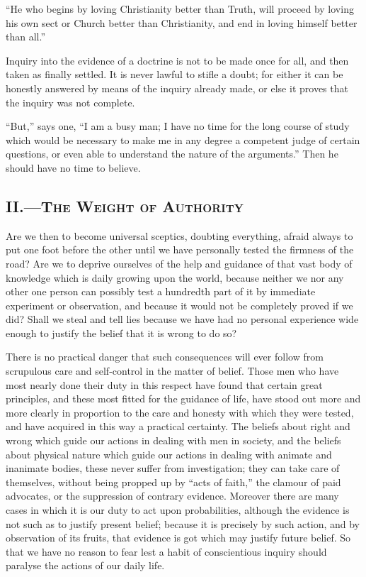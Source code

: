 \documentclass[12pt]{article}
\begin{document}
``He who begins by loving Christianity better than Truth, will proceed by loving his own sect or Church better than Christianity, and end in loving himself better than all.''

Inquiry into the evidence of a doctrine is not to be made once for all, and then taken as finally settled. It is never lawful to stifle a doubt; for either it can be honestly answered by means of the inquiry already made, or else it proves that the inquiry was not complete.

``But,'' says one, ``I am a busy man; I have no time for the long course of study which would be necessary to make me in any degree a competent judge of certain questions, or even able to understand the nature of the arguments.'' Then he should have no time to believe.

\subsection*{II.---\textsc{The Weight of Authority}}

Are we then to become universal sceptics, doubting everything, afraid always to put one foot before the other until we have personally tested the firmness of the road? Are we to deprive ourselves of the help and guidance of that vast body of knowledge which is daily growing upon the world, because neither we nor any other one person can possibly test a hundredth part of it by immediate experiment or observation, and because it would not be completely proved if we did? Shall we steal and tell lies because we have had no personal experience wide enough to justify the belief that it is wrong to do so?

There is no practical danger that such consequences will ever follow from scrupulous care and self-control in the matter of belief. Those men who have most nearly done their duty in this respect have found that certain great principles, and these most fitted for the guidance of life, have stood out more and more clearly in proportion to the care and honesty with which they were tested, and have acquired in this way a practical certainty. The beliefs about right and wrong which guide our actions in dealing with men in society, and the beliefs about physical nature which guide our actions in dealing with animate and inanimate bodies, these never suffer from investigation; they can take care of themselves, without being propped up by ``acts of faith,'' the clamour of paid advocates, or the suppression of contrary evidence. Moreover there are many cases in which it is our duty to act upon probabilities, although the evidence is not such as to justify present belief; because it is precisely by such action, and by observation of its fruits, that evidence is got which may justify future belief. So that we have no reason to fear lest a habit of conscientious inquiry should paralyse the actions of our daily life.
\end{document}
